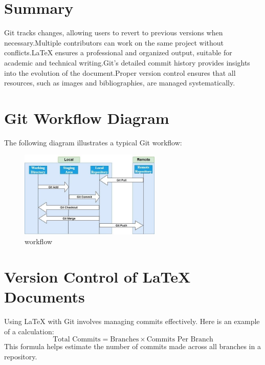 \documentclass{article}
\begin{document}
\section{Summary}
Git tracks changes, allowing users to revert to previous versions when necessary.Multiple contributors can work on the same project without conflicts.LaTeX ensures a professional and organized output, suitable for academic and technical writing.Git's detailed commit history provides insights into the evolution of the document.Proper version control ensures that all resources, such as images and bibliographies, are managed systematically.




\section{Git Workflow Diagram}
The following diagram illustrates a typical Git workflow:\\ 
\begin{figure}[h]
     \centering
    \includegraphics[width=0.6\textwidth]{git_workflow.jpg}
    \caption{workflow}
    \label{fig:Figure 1}
\end{figure}

\section{Version Control of LaTeX Documents}
Using LaTeX with Git involves managing commits effectively. Here is an example of a calculation:
\begin{equation}
    \text{Total Commits} = \text{Branches} \times \text{Commits Per Branch}
\end{equation}
This formula helps estimate the number of commits made across all branches in a repository.



\end{document}

